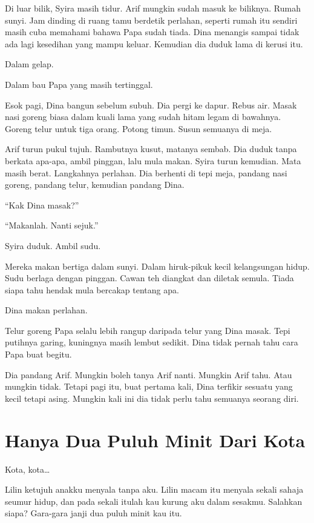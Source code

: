 \documentclass[
  11pt,
  a5paper,
  openany,
  oneside]{book}
\begin{document}
Di luar bilik, Syira masih tidur. Arif mungkin sudah masuk ke biliknya.
Rumah sunyi. Jam dinding di ruang tamu berdetik perlahan, seperti rumah
itu sendiri masih cuba memahami bahawa Papa sudah tiada. Dina menangis
sampai tidak ada lagi kesedihan yang mampu keluar. Kemudian dia duduk
lama di kerusi itu.

Dalam gelap.

Dalam bau Papa yang masih tertinggal.

Esok pagi, Dina bangun sebelum subuh. Dia pergi ke dapur. Rebus air.
Masak nasi goreng biasa dalam kuali lama yang sudah hitam legam di
bawahnya. Goreng telur untuk tiga orang. Potong timun. Susun semuanya di
meja.

Arif turun pukul tujuh. Rambutnya kusut, matanya sembab. Dia duduk tanpa
berkata apa-apa, ambil pinggan, lalu mula makan. Syira turun kemudian.
Mata masih berat. Langkahnya perlahan. Dia berhenti di tepi meja,
pandang nasi goreng, pandang telur, kemudian pandang Dina.

``Kak Dina masak?''

``Makanlah. Nanti sejuk.''

Syira duduk. Ambil sudu.

Mereka makan bertiga dalam sunyi. Dalam hiruk-pikuk kecil kelangsungan
hidup. Sudu berlaga dengan pinggan. Cawan teh diangkat dan diletak
semula. Tiada siapa tahu hendak mula bercakap tentang apa.

Dina makan perlahan.

Telur goreng Papa selalu lebih rangup daripada telur yang Dina masak.
Tepi putihnya garing, kuningnya masih lembut sedikit. Dina tidak pernah
tahu cara Papa buat begitu.

Dia pandang Arif. Mungkin boleh tanya Arif nanti. Mungkin Arif tahu.
Atau mungkin tidak. Tetapi pagi itu, buat pertama kali, Dina terfikir
sesuatu yang kecil tetapi asing. Mungkin kali ini dia tidak perlu tahu
semuanya seorang diri.

\chapter{Hanya Dua Puluh Minit Dari
Kota}\label{hanya-dua-puluh-minit-dari-kota}

Kota, kota\ldots{}

Lilin ketujuh anakku menyala tanpa aku. Lilin macam itu menyala sekali
sahaja seumur hidup, dan pada sekali itulah kau kurung aku dalam
sesakmu. Salahkan siapa? Gara-gara janji dua puluh minit kau itu.
\end{document}
